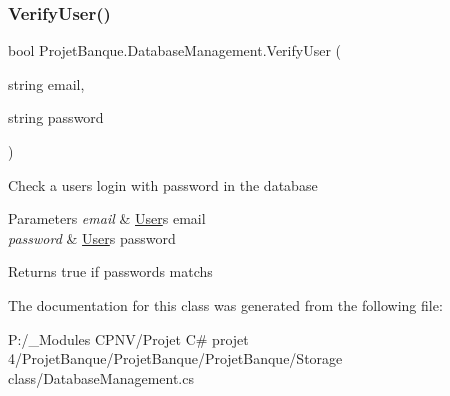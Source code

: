 \subsubsection{\texorpdfstring{VerifyUser()}{VerifyUser()}}
{\footnotesize\ttfamily bool Projet\+Banque.\+Database\+Management.\+Verify\+User (\begin{DoxyParamCaption}\item[{string}]{email,  }\item[{string}]{password }\end{DoxyParamCaption})}



Check a user\textquotesingle{}s login with password in the database 


\begin{DoxyParams}{Parameters}
{\em email} & \mbox{\hyperlink{class_projet_banque_1_1_user}{User}}\textquotesingle{}s email\\
\hline
{\em password} & \mbox{\hyperlink{class_projet_banque_1_1_user}{User}}\textquotesingle{}s password\\
\hline
\end{DoxyParams}
\begin{DoxyReturn}{Returns}
true if passwords matchs
\end{DoxyReturn}


The documentation for this class was generated from the following file\+:\begin{DoxyCompactItemize}
\item 
P\+:/\+\_\+\+Modules C\+P\+N\+V/\+Projet C\# projet 4/\+Projet\+Banque/\+Projet\+Banque/\+Projet\+Banque/\+Storage class/Database\+Management.\+cs\end{DoxyCompactItemize}
